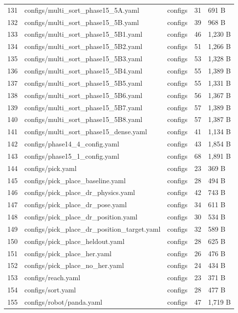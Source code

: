 \documentclass[11pt,a4paper,oneside]{book}
\begin{document}
\begin{longtable}{l l l l l}
131 & configs/multi\_sort\_phase15\_5A.yaml & configs & 31 & 691 B \\
132 & configs/multi\_sort\_phase15\_5B.yaml & configs & 39 & 968 B \\
133 & configs/multi\_sort\_phase15\_5B1.yaml & configs & 46 & 1,230 B \\
134 & configs/multi\_sort\_phase15\_5B2.yaml & configs & 51 & 1,266 B \\
135 & configs/multi\_sort\_phase15\_5B3.yaml & configs & 53 & 1,328 B \\
136 & configs/multi\_sort\_phase15\_5B4.yaml & configs & 55 & 1,389 B \\
137 & configs/multi\_sort\_phase15\_5B5.yaml & configs & 55 & 1,331 B \\
138 & configs/multi\_sort\_phase15\_5B6.yaml & configs & 56 & 1,367 B \\
139 & configs/multi\_sort\_phase15\_5B7.yaml & configs & 57 & 1,389 B \\
140 & configs/multi\_sort\_phase15\_5B8.yaml & configs & 57 & 1,387 B \\
141 & configs/multi\_sort\_phase15\_dense.yaml & configs & 41 & 1,134 B \\
142 & configs/phase14\_4\_config.yaml & configs & 43 & 1,854 B \\
143 & configs/phase15\_1\_config.yaml & configs & 68 & 1,891 B \\
144 & configs/pick.yaml & configs & 23 & 369 B \\
145 & configs/pick\_place\_baseline.yaml & configs & 28 & 494 B \\
146 & configs/pick\_place\_dr\_physics.yaml & configs & 42 & 743 B \\
147 & configs/pick\_place\_dr\_pose.yaml & configs & 34 & 611 B \\
148 & configs/pick\_place\_dr\_position.yaml & configs & 30 & 534 B \\
149 & configs/pick\_place\_dr\_position\_target.yaml & configs & 32 & 589 B \\
150 & configs/pick\_place\_heldout.yaml & configs & 28 & 625 B \\
151 & configs/pick\_place\_her.yaml & configs & 26 & 476 B \\
152 & configs/pick\_place\_no\_her.yaml & configs & 24 & 434 B \\
153 & configs/reach.yaml & configs & 23 & 371 B \\
154 & configs/sort.yaml & configs & 28 & 477 B \\
155 & configs/robot/panda.yaml & configs & 47 & 1,719 B \\

\end{longtable}
\end{document}
